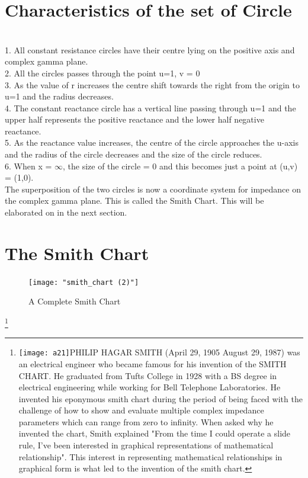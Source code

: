 \section{Characteristics of the set of Circle}\\

1.	All constant resistance circles have their centre lying on the positive axis and complex gamma plane.\\
2.	All the circles passes through the point u=1, v = 0\\
3.	As the value of r increases the centre shift towards the right from the origin to u=1 and the radius decreases.\\
4.	The constant reactance circle has a vertical line passing through u=1 and the upper half represents the positive reactance and the lower half negative reactance.\\
5.	As the reactance value increases, the centre of the circle approaches the u-axis and the radius of the circle decreases and the size of the circle reduces.\\
6.	When x = $\infty$, the size of the circle = 0  and this  becomes just a point at (u,v) = (1,0).\\

The superposition of the two circles is now a coordinate system for impedance on the complex gamma plane. This is called the Smith Chart.  This will be elaborated on in  the next section.
\section{\textbf{The Smith Chart}}
\begin{figure}[h]
\centering
\texttt{[image: "smith\_chart (2)"]}
\caption{A Complete Smith Chart}
\label{fig:smithchart-2}
\end{figure}

\footnote{\texttt{[image: a21]}PHILIP HAGAR SMITH (April 29, 1905  August 29, 1987) was an electrical engineer who became famous for his invention of the SMITH CHART. He graduated from Tufts College in 1928 with a BS degree in electrical engineering while working for Bell Telephone Laboratories. He invented his eponymous smith chart during the period of being faced with the challenge of how to show and evaluate multiple complex impedance parameters which can range from zero to infinity. When asked why he invented the chart, Smith explained "From the time I could operate a slide rule, I've been interested in graphical representations of mathematical relationship". This interest in representing mathematical relationships in graphical form is what led to the invention of the smith chart.}



